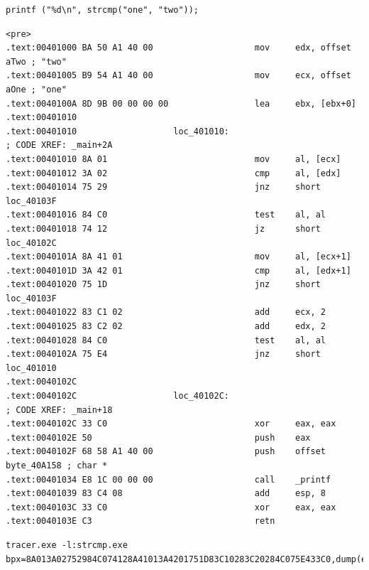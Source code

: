 
\begin{lstlisting}
printf ("%d\n", strcmp("one", "two"));
\end{lstlisting}


\begin{lstlisting}
<pre>
.text:00401000 BA 50 A1 40 00                    mov     edx, offset aTwo ; "two"
.text:00401005 B9 54 A1 40 00                    mov     ecx, offset aOne ; "one"
.text:0040100A 8D 9B 00 00 00 00                 lea     ebx, [ebx+0]
.text:00401010
.text:00401010                   loc_401010:                             ; CODE XREF: _main+2A
.text:00401010 8A 01                             mov     al, [ecx]
.text:00401012 3A 02                             cmp     al, [edx]
.text:00401014 75 29                             jnz     short loc_40103F
.text:00401016 84 C0                             test    al, al
.text:00401018 74 12                             jz      short loc_40102C
.text:0040101A 8A 41 01                          mov     al, [ecx+1]
.text:0040101D 3A 42 01                          cmp     al, [edx+1]
.text:00401020 75 1D                             jnz     short loc_40103F
.text:00401022 83 C1 02                          add     ecx, 2
.text:00401025 83 C2 02                          add     edx, 2
.text:00401028 84 C0                             test    al, al
.text:0040102A 75 E4                             jnz     short loc_401010
.text:0040102C
.text:0040102C                   loc_40102C:                             ; CODE XREF: _main+18
.text:0040102C 33 C0                             xor     eax, eax
.text:0040102E 50                                push    eax
.text:0040102F 68 58 A1 40 00                    push    offset byte_40A158 ; char *
.text:00401034 E8 1C 00 00 00                    call    _printf
.text:00401039 83 C4 08                          add     esp, 8
.text:0040103C 33 C0                             xor     eax, eax
.text:0040103E C3                                retn
\end{lstlisting}


\begin{lstlisting}
tracer.exe -l:strcmp.exe bpx=8A013A02752984C074128A41013A4201751D83C10283C20284C075E433C0,dump(ecx,0x10),dump(edx,0x10)
\end{lstlisting}

